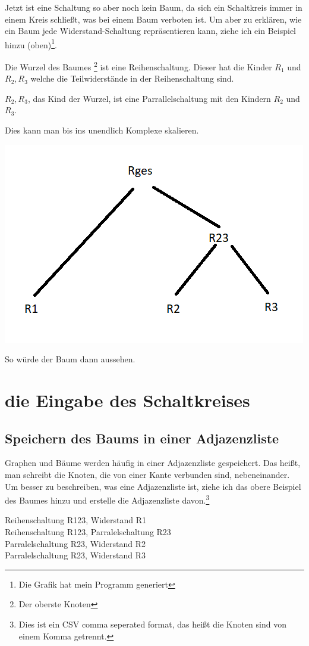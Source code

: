 \documentclass[a4paper,10pt,ngerman]{scrartcl}
\begin{document}
Jetzt ist eine Schaltung so aber noch kein Baum, da sich ein Schaltkreis immer in einem Kreis schließt, was bei einem Baum verboten ist. Um aber zu erklären, wie ein Baum jede Widerstand-Schaltung repräsentieren kann, ziehe ich ein Beispiel hinzu (oben)\footnote{Die Grafik hat mein Programm generiert}.

Die Wurzel des Baumes \footnote{Der oberste Knoten} ist eine Reihenschaltung. Dieser hat die Kinder $R_1$ und $R_2, R_3$ welche die Teilwiderstände in der Reihenschaltung sind.

$R_2, R_3$, das Kind der Wurzel, ist eine Parrallelschaltung mit den Kindern $R_2$ und $R_3$.

Dies kann man bis ins unendlich Komplexe skalieren.

\includegraphics[width=.7\textwidth]{baum.png}

So würde der Baum dann aussehen.

\section{die Eingabe des Schaltkreises}

\subsection{Speichern des Baums in einer Adjazenzliste}

Graphen und Bäume werden häufig in einer Adjazenzliste gespeichert. Das heißt, man schreibt die Knoten, die von einer Kante verbunden sind, nebeneinander. Um besser zu beschreiben, was eine Adjazenzliste ist, ziehe ich das obere Beispiel des Baumes hinzu und erstelle die Adjazenzliste davon.\footnote{Dies ist ein CSV comma seperated format, das heißt die Knoten sind von einem Komma getrennt.}

\begin{flushleft}
Reihenschaltung R123, Widerstand R1\\
Reihenschaltung R123, Parralelschaltung R23\\
Parralelschaltung R23, Widerstand R2\\
Parralelschaltung R23, Widerstand R3\\
\end{flushleft}
\end{document}
